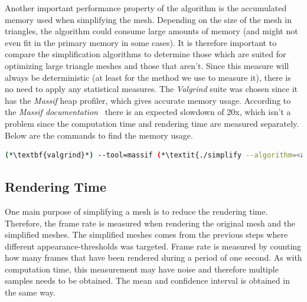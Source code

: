 Another important performance property of the algorithm is the accumulated memory used when simplifying the mesh. Depending on the size of the mesh in triangles, the algorithm could consume large amounts of memory (and might not even fit in the primary memory in some cases). It is therefore important to compare the simplification algorithms to determine those which are suited for optimizing large triangle meshes and those that aren't. Since this measure will always be deterministic (at least for the method we use to measure it), there is no need to apply any statistical measures. The \emph{Valgrind} suite was chosen since it has the \emph{Massif} heap profiler, which gives accurate memory usage. According to the \emph{Massif documentation}~\cite{valgrind2017manual} there is an expected slowdown of 20x, which isn't a problem since the computation time and rendering time are measured separately. Below are the commands to find the memory usage.

\begin{lstlisting}[language=bash]
  (*\textbf{valgrind}*) --tool=massif (*\textit{./simplify --algorithm=<algorithm> <input-mesh> <output-mesh>}*)
\end{lstlisting}

\subsection{Rendering Time} \label{sec:rendering_time}
One main purpose of simplifying a mesh is to reduce the rendering time. Therefore, the frame rate is measured when rendering the original mesh and the simplified meshes. The simplified meshes comes from the previous steps where different appearance-thresholds was targeted. Frame rate is measured by counting how many frames that have been rendered during a period of one second. As with computation time, this measurement may have noise and therefore multiple samples needs to be obtained. The mean and confidence interval is obtained in the same way.
\fi



